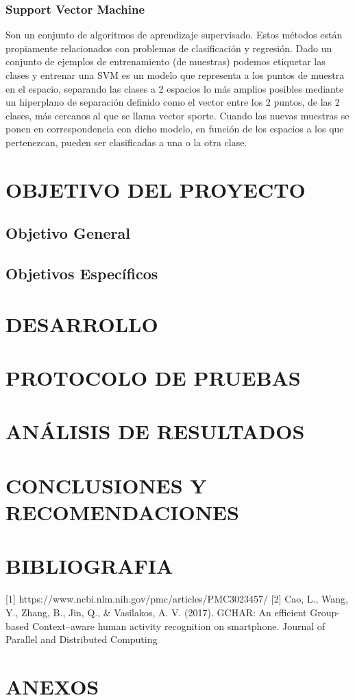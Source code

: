 \documentclass[11pt]{report} %
\begin{document}
\subsection {Support Vector Machine}
Son un conjunto de algoritmos de aprendizaje supervisado. Estos métodos están propiamente relacionados con problemas de clasificación y regresión. Dado un conjunto de ejemplos de entrenamiento (de muestras) podemos etiquetar las clases y entrenar una SVM es un modelo que representa a los puntos de muestra en el espacio, separando las clases a 2 espacios lo más amplios posibles mediante un hiperplano de separación definido como el vector entre los 2 puntos, de las 2 clases, más cercanos al que se llama vector sporte. Cuando las nuevas muestras se ponen en correspondencia con dicho modelo, en función de los espacios a los que pertenezcan, pueden ser clasificadas a una o la otra clase.

\chapter{OBJETIVO DEL PROYECTO}

\section{Objetivo General}

\section{Objetivos Específicos}

\chapter{DESARROLLO}

\chapter{PROTOCOLO DE PRUEBAS}

\chapter{ANÁLISIS DE RESULTADOS}

\chapter{CONCLUSIONES Y RECOMENDACIONES}

\chapter{BIBLIOGRAFIA}

[1] https://www.ncbi.nlm.nih.gov/pmc/articles/PMC3023457/
[2] Cao, L., Wang, Y., Zhang, B., Jin, Q., \& Vasilakos, A. V. (2017). GCHAR: An efficient Group-based Context–aware human activity recognition on smartphone. Journal of Parallel and Distributed Computing

\chapter{ANEXOS}
\end{document}
